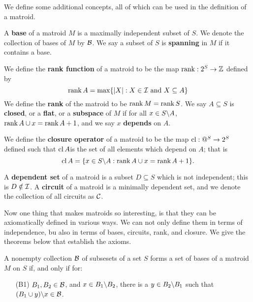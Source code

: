 We define some additional concepts, all of which can be used in the definition of a matroid.

\begin{definition}
    A \textbf{base} of a matroid $M$ is a maximally independent subset of  $S$. We denote the
    collection of bases of $M$ by  $\mathcal{B}$. We say a subset of  $S$ is \textbf {spanning} in $M$ if it
    contains a base.
\end{definition}

\begin{definition}
    We define the \textbf{rank function} of a matroid to be the map $\operatorname{rank}:2^S \rightarrow \mathbb{Z}$
    defined by
        \begin{equation}
        \operatorname{rank}{A}=\max\{|X|:X \in \mathcal{I} \text{ and } X \subseteq A\}
        \end{equation} 
    We define the \textbf{rank} of the matroid to be $\operatorname{rank}{M}=\operatorname{rank}{S}$. We say $A \subseteq S$ is
    \textbf{closed}, or a \textbf{flat}, or a \textbf{subspace} of $M$ if for all  $x \in
    S\backslash A$, $\operatorname{rank}{A \cup x}=\operatorname{rank}{A}+1$, and we say $x$ \textbf{depends} on $A$.
\end{definition}

\begin{definition}
    We define the \textbf{closure operator} of a matroid to be the map $\operatorname{cl}:@^S \rightarrow 2^S$
    defined such that  $\operatorname{cl}{A}$is the set of all elements which depend on $A$; that is
        \begin{equation}
            \operatorname{cl}{A}=\{x \in S\backslash A:\operatorname{rank}{A \cup x}=\operatorname{rank}{A}+1\}.
        \end{equation}
\end{definition}

\begin{definition}
    A \textbf{dependent set} of a matroid is a subset $D \subseteq S$ which is not independent; this
    is $D \notin \mathcal{I}$. A \textbf {circuit} of a matroid is a minimally dependent set, and we denote
    the collection of all circuits as $\mathcal{C}$.
\end{definition}

Now one thing that makes matroids so interesting, is that they can be axiomatically defined in
various ways. We can not only define them in terms of independence, bu also in terms of bases,
circuits, rank, and closure. We give the theorems below that establish the axioms.

\begin{theorem}\label{1.1.1}
    A nonempty collection $\mathcal{B}$ of subsesets of a set $S$ forms a set of bases of a matroid $M$ on
    $S$ if, and only if for:
        \begin{enumerate}
            \item[(B1)] $ B_1,B_2 \in \mathcal{B}$, and $x \in B_1\backslash B_2$, there is a $y \in
                B_2\backslash B_1$ such that $(B_1 \cup y)\backslash x \in \mathcal{B}$.
        \end{enumerate}
\end{theorem}

